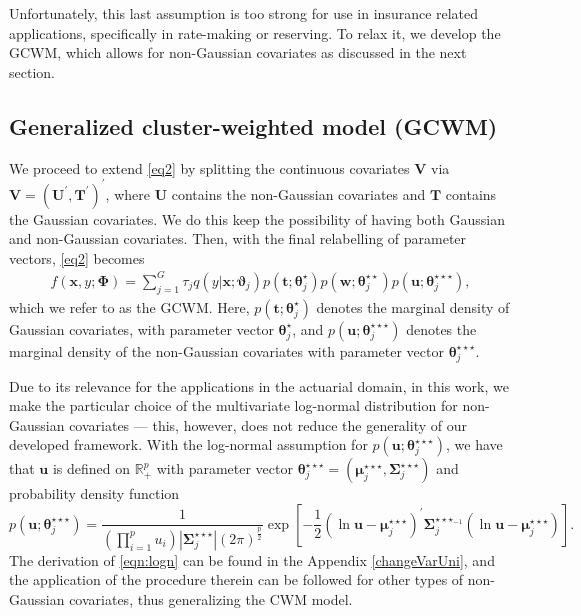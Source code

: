 \documentclass[12pt,letterpaper]{article}
\numberwithin{equation}{section}
\numberwithin{equation}{section}
\numberwithin{equation}{section}
\begin{document}
Unfortunately, this last assumption is too strong for use in insurance related applications, specifically in rate-making or reserving. To relax it, we develop the GCWM, which allows for non-Gaussian covariates as discussed in the next section.

\subsection{Generalized cluster-weighted model (GCWM) }
We proceed to extend \eqref{eq2} by splitting the continuous covariates $\bm{V}$ via $\bm{V}=(\bm U^{'}, \bm T^{'})^{'}$, where $\bm{U}$ contains the non-Gaussian covariates and $\bm{T}$ contains the Gaussian covariates. We do this keep the possibility of having both Gaussian and non-Gaussian covariates. Then, with the final relabelling of parameter vectors, \eqref{eq2} becomes
\begin{align}
 f(\bm x, y; \bm{\Phi})= \sum_{j=1}^{G} \tau_j q(y|\bm{x};\bm{\vartheta}_j)p(\bm{t};\bm{\theta}_j^{\star})p(\bm{w};\bm{\theta}_j^{\star\star})p(\bm{u};\bm{\theta}_j^{\star\star\star}),
\label{eq3}
\end{align}
which we refer to as the GCWM. Here, $p(\bm{t};\bm{\theta}_j^{\star})$ denotes the marginal density of Gaussian covariates, with parameter vector $\bm{\theta}^{\star}_j$, and $p(\bm{u};\bm{\theta}_j^{\star\star\star})$ denotes the marginal density of the non-Gaussian covariates with parameter vector $ \bm{ \theta}_j^{\star\star\star} $.


Due to its relevance for the applications in the actuarial domain, in this work, we make the particular choice of the multivariate log-normal distribution  for non-Gaussian covariates --- this, however, does not reduce the generality of our developed framework. With the log-normal assumption for $p(\bm{u};\bm{\theta}_j^{\star\star\star})$, we have that $\bm{u}$ is defined on $\mathbb{R}^p_+$ with parameter vector $\bm{\theta}_j^{\star\star\star}= (\bm{\mu}_j^{\star\star\star} ,\bm{\Sigma}_j^{\star\star\star})$ and probability density function
\begin{equation}\label{eqn:logn} 
p \left(  \bm{u}; \bm{\theta}_j^{\star\star\star} \right) = \frac{1}{(\prod_{i=1}^{p}u_{i})|\bm{ \Sigma}_j^{\star\star\star} |(2 \pi)^{\frac{p}{2}}}   \exp\left[-\frac{1}{2}(\ln\bm{ u}-\bm{\mu}_j^{\star\star\star})^{'}\bm{\Sigma}_j^{{\star\star\star}_{-1}}(\ln \bm {u}-\bm{\mu}_j^{\star\star\star})\right].
\end{equation} The derivation of \eqref{eqn:logn} can be found in the Appendix \ref{changeVarUni}, and the application of the procedure therein can be followed for other types of non-Gaussian covariates, thus generalizing the CWM model.
\end{document}

